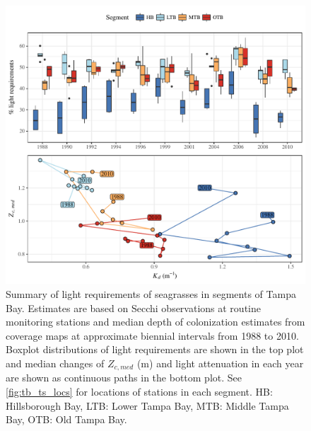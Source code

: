 \documentclass[letterpaper,12pt,oneside]{article}\usepackage[]{graphicx}\usepackage[]{color}
\newcommand{\beginsupplement}{%
        \setcounter{table}{0}
        \renewcommand{\thetable}{S\arabic{table}}%
        \setcounter{figure}{0}
        \renewcommand{\thefigure}{S\arabic{figure}}%
     }
\begin{document}
\begin{figure}
\centering
\includegraphics[width = \textwidth]{figs/Fig10.pdf}
\caption{Summary of light requirements of seagrasses in segments of Tampa Bay. Estimates are based on Secchi observations at routine monitoring stations and median depth of colonization estimates from coverage maps at approximate biennial intervals from 1988 to 2010.  Boxplot distributions of light requirements are shown in the top plot and median changes of $Z_{c, med}$ (m) and light attenuation in each year are shown as continuous paths in the bottom plot. See \cref{fig:tb_ts_locs} for locations of stations in each segment. HB: Hillsborough Bay, LTB: Lower Tampa Bay, MTB: Middle Tampa Bay, OTB: Old Tampa Bay.}
\label{fig:tb_ts}
\end{figure}
\clearpage

\beginsupplement

\end{document}
